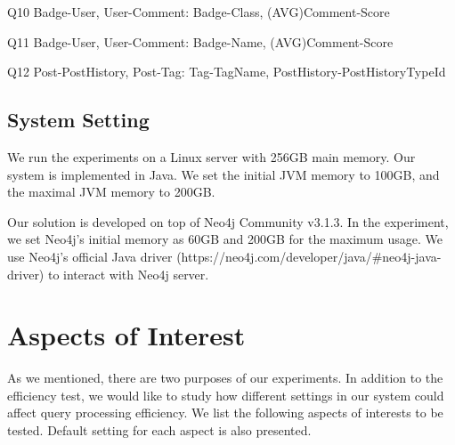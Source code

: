 Q10 \hspace{1.3mm} Badge-User, User-Comment: Badge-Class, (AVG)Comment-Score

Q11 \hspace{1.3mm} Badge-User, User-Comment: Badge-Name, (AVG)Comment-Score

Q12 \hspace{1.3mm} Post-PostHistory, Post-Tag: Tag-TagName, PostHistory-PostHistoryTypeId





\subsection{System Setting}

We run the experiments on a Linux server with 256GB main memory. Our system is implemented in Java. We set the initial JVM memory to 100GB, and the maximal JVM memory to 200GB.

Our solution is developed on top of Neo4j Community v3.1.3. In the experiment, we set Neo4j's initial memory as 60GB and 200GB for the maximum usage. We use Neo4j's official Java driver (https://neo4j.com/developer/java/\#neo4j-java-driver) to interact with Neo4j server.

\section{Aspects of Interest}
\label{Aspects of Interest}

As we mentioned, there are two purposes of our experiments. In addition to the efficiency test, we would like to study how different settings in our system could affect query processing efficiency. We list the following aspects of interests to be tested. Default setting for each aspect is also presented. 

